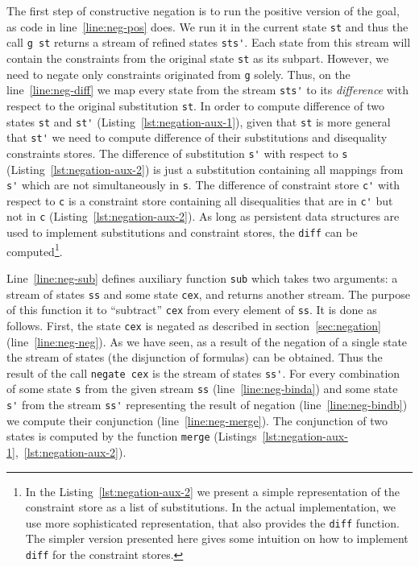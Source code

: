 The first step of constructive negation
is to run the positive version of the goal,
as code in line~\ref{line:neg-pos} does.
We run it in the current state \lstinline{st}
and thus the call \lstinline{g st} returns
a stream of refined states \lstinline{sts'}.
Each state from this stream will contain 
the constraints from the original state \lstinline{st}
as its subpart.
However, we need to negate only constraints
originated from \lstinline{g} solely.
Thus, on the line~\ref{line:neg-diff} 
we map every state from the stream \lstinline{sts'}
to its \emph{difference} with respect to 
the original substitution \lstinline{st}.
In order to compute difference of two states \lstinline{st} and \lstinline{st'}
(Listing~\ref{lst:negation-aux-1}),
given that \lstinline{st} is more general that \lstinline{st'}
we need to compute difference of their substitutions and 
disequality constraints stores.
The difference of substitution \lstinline{s'} with respect to \lstinline{s}
(Listing~\ref{lst:negation-aux-2})
is just a substitution containing all mappings from \lstinline{s'}
which are not simultaneously in \lstinline{s}.
The difference of constraint store \lstinline{c'} with respect to \lstinline{c}
is a constraint store containing all disequalities
that are in \lstinline{c'} but not in \lstinline{c}
(Listing~\ref{lst:negation-aux-2}).
As long as persistent data structures are used 
to implement substitutions and constraint stores,
the \lstinline{diff} can be computed\footnote{
In the Listing~\ref{lst:negation-aux-2} 
we present a simple representation 
of the constraint store as a list of substitutions. 
In the actual implementation, we use 
more sophisticated representation, 
that also provides the \lstinline{diff} function.
The simpler version presented here 
gives some intuition 
on how to implement \lstinline{diff} for the constraint stores.
}.

Line~\ref{line:neg-sub} defines auxiliary function \lstinline{sub}
which takes two arguments: 
a stream of states \lstinline{ss}
and some state \lstinline{cex}, and 
returns another stream.
The purpose of this function it to 
``subtract'' \lstinline{cex} from 
every element of \lstinline{ss}.
It is done as follows.
First, the state \lstinline{cex} is negated 
as described in section~\ref{sec:negation} (line~\ref{line:neg-neg}).
As we have seen, as a result of the negation of a single
state the stream of states (the disjunction of formulas) can be obtained.
Thus the result of the call \lstinline{negate cex} is 
the stream of states \lstinline{ss'}.
For every combination of some state \lstinline{s} from 
the given stream \lstinline{ss} (line~\ref{line:neg-binda}) 
and some state \lstinline{s'} from the stream \lstinline{ss'} 
representing the result of negation (line~\ref{line:neg-bindb}) 
we compute their conjunction (line~\ref{line:neg-merge}).
The conjunction of two states is computed by
the function \lstinline{merge} 
(Listings~\ref{lst:negation-aux-1},~\ref{lst:negation-aux-2}).

